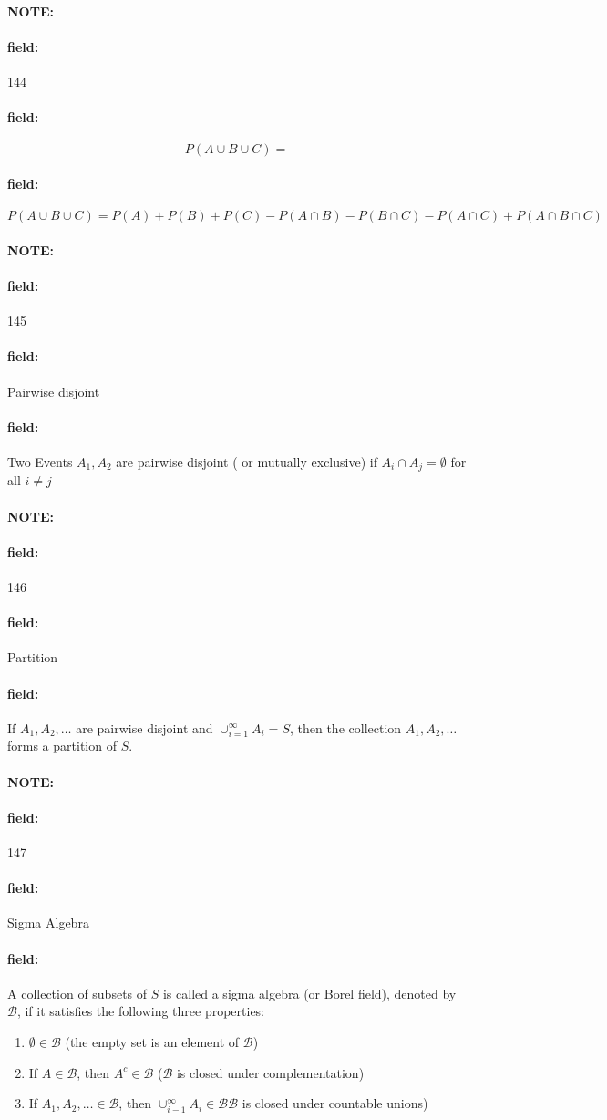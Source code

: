 \documentclass[12pt]{article}
\newenvironment{note}{\paragraph{NOTE:}}{}
\newenvironment{field}{\paragraph{field:}}{}
\begin{document}
\begin{note} \begin{field} \tiny 144 \end{field}
  \begin{field}
    $$P(A \cup B \cup C) =  $$
  \end{field}
  \begin{field}
    $$P(A \cup B \cup C) =  P(A) + P(B) + P(C) - P(A \cap B) - P(B\cap C) - P(A \cap C) + P(A \cap B \cap C)$$
  \end{field}
\end{note}



\begin{note} \begin{field} \tiny 145 \end{field}
  \begin{field}
    Pairwise disjoint
  \end{field}
    \begin{field}
        Two Events $A_1, A_2$ are pairwise disjoint ( or mutually exclusive) if $A_i \cap A_j = \emptyset $ for all $i \neq j$
    \end{field}
\end{note}

\begin{note} \begin{field} \tiny 146 \end{field}
    \begin{field}
      Partition
    \end{field}
    \begin{field}
        If $A_1, A_2, \ldots$ are pairwise disjoint and $\cup_{i=1}^\infty A_i = S$, then the collection $A_1, A_2, \ldots$ forms a partition of $S$.
    \end{field}
\end{note}

\begin{note} \begin{field} \tiny 147 \end{field}
    \begin{field}
        Sigma Algebra
    \end{field}
    \begin{field}
        A collection of subsets of $S$ is called a sigma algebra (or Borel field), denoted by $\mathcal{B}$, if it satisfies the following three properties:
            \begin{enumerate}
              \item $\emptyset \in \mathcal{B}$ (the empty set is an element of $\mathcal{B}$)
              \item If $A \in \mathcal{B}$, then $A^c \in \mathcal{B}$ ($\mathcal{B}$ is closed under complementation)
              \item If $A_1, A_2, \ldots \in \mathcal{B}$, then $\cup_{i-1}^\infty A_i \in \mathcal{B} \mathcal{B}$ is closed under countable unions)
            \end{enumerate}
    \end{field}
\end{note}
\end{document}
